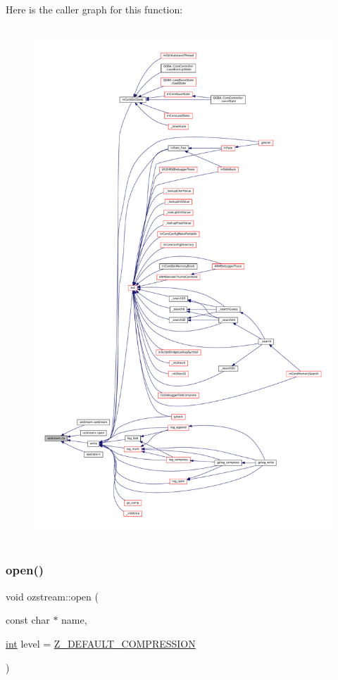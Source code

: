 Here is the caller graph for this function\+:
\nopagebreak
\begin{figure}[H]
\begin{center}
\leavevmode
\includegraphics[height=550pt]{classozstream_ab1743675ebfa7173c06f803f41844b18_icgraph}
\end{center}
\end{figure}
\mbox{\label{classozstream_aea598e6f8f3bb1ffff903546d98b14f0}} 
\subsubsection{\texorpdfstring{open()}{open()}\hspace{0.1cm}{\footnotesize\ttfamily [1/2]}}
{\footnotesize\ttfamily void ozstream\+::open (\begin{DoxyParamCaption}\item[{const char $\ast$}]{name,  }\item[{\mbox{\hyperlink{ioapi_8h_a787fa3cf048117ba7123753c1e74fcd6}{int}}}]{level = {\ttfamily \mbox{\hyperlink{zlib_8h_af5387baee05124298e431ebe6fe96b17}{Z\+\_\+\+D\+E\+F\+A\+U\+L\+T\+\_\+\+C\+O\+M\+P\+R\+E\+S\+S\+I\+ON}}} }\end{DoxyParamCaption})\hspace{0.3cm}{\ttfamily [inline]}}

